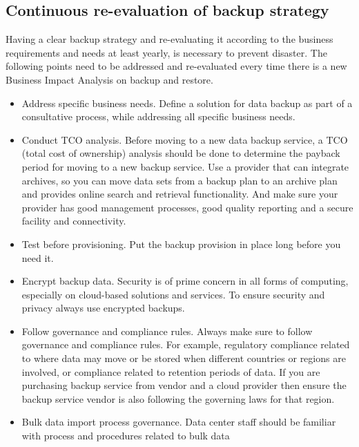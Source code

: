 
\subsection{Continuous re-evaluation of backup strategy}

Having a clear backup strategy and re-evaluating it according to the
business requirements and needs at least yearly, is necessary to prevent
disaster. The following points need to be addressed and re-evaluated
every time there is a new Business Impact Analysis on backup and
restore.

\begin{itemize}
	\item Address specific business needs. Define a solution for data
		backup as part of a consultative process, while addressing all
		specific business needs.
	\item Conduct TCO analysis. Before moving to a new data backup
		service, a TCO (total cost of ownership) analysis should be done
		to determine the payback period for moving to a new backup
		service. Use a provider that can integrate archives, so you can
		move data sets from a backup plan to an archive plan and
		provides online search and retrieval functionality. And make
		sure your provider has good management processes, good quality
		reporting and a secure facility and connectivity.
	\item Test before provisioning. Put the backup provision in place
		long before you need it.
	\item Encrypt backup data. Security is of prime concern in all forms
		of computing, especially on cloud-based solutions and services.
		To ensure security and privacy always use encrypted backups.
	\item Follow governance and compliance rules. Always make sure to
		follow governance and compliance rules. For example, regulatory
		compliance related to where data may move or be stored when
		different countries or regions are involved, or compliance
		related to retention periods of data. If you are purchasing
		backup service from vendor and a cloud provider then ensure the
		backup service vendor is also following the governing laws for
		that region.
	\item Bulk data import process governance. Data center staff should
		be familiar with process and procedures related to bulk data

\end{itemize}

